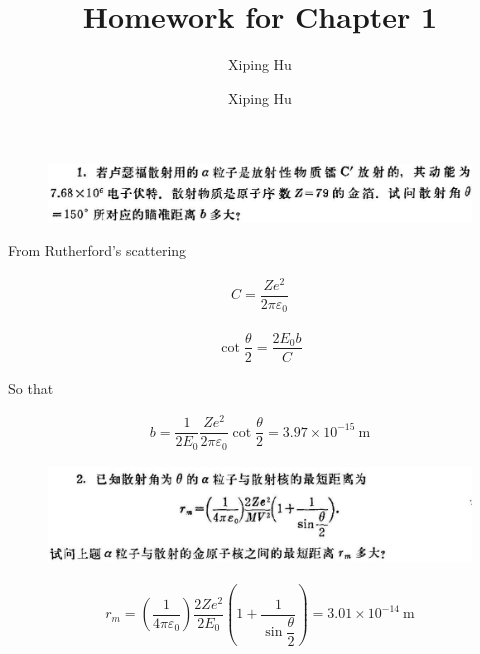\documentclass{article}
\author{Xiping Hu}
\author{Xiping Hu}
\affil{https://hxp.plus/}
\title{Homework for Chapter 1}
\begin{document}
\maketitle

\begin{figure}[H]
  \centering
  \includegraphics[width=\linewidth]{figures/Problem1}
  \label{fig:}
\end{figure}

From Rutherford's scattering

\begin{equation*}
  \begin{aligned}
    C = \dfrac{Z e^2}{2 \pi \varepsilon_0} 
  \end{aligned}
\end{equation*}

\begin{equation*}
  \begin{aligned}
    \cot \dfrac{\theta}{2} = \dfrac{2 E_0 b}{C}  
  \end{aligned}
\end{equation*}

So that

\begin{equation*}
  \begin{aligned}
    b = \dfrac{1}{2 E_0}  \dfrac{Z e^2}{2 \pi \varepsilon_0} \cot \dfrac{\theta}{2} = 3.97 \times 10^{-15} \  \mathrm{m}
  \end{aligned}
\end{equation*}

\begin{figure}[H]
  \centering
  \includegraphics[width=\linewidth]{figures/Problem2}
  \label{fig:}
\end{figure}

\begin{equation*}
  \begin{aligned}
    r_m = \left( \dfrac{1}{4 \pi \varepsilon_0} \right) \dfrac{2Ze^2}{2 E_0} \left( 1 + \dfrac{1}{\sin \dfrac{\theta}{2} }  \right) = 3.01 \times 10^{-14} \  \mathrm{m}
  \end{aligned}
\end{equation*}
\end{document}
